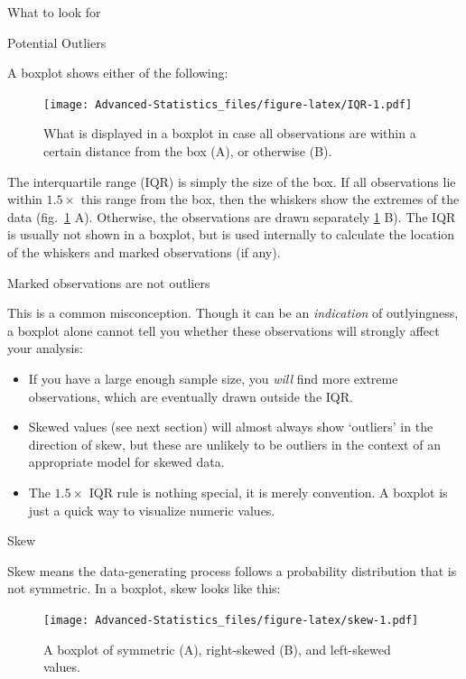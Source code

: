 \documentclass[
]{book}
\providecommand{\tightlist}{%
  \setlength{\itemsep}{0pt}\setlength{\parskip}{0pt}}
\begin{document}
What to look for

Potential Outliers

A boxplot shows either of the following:

\begin{figure}
\centering
\texttt{[image: Advanced-Statistics\_files/figure-latex/IQR-1.pdf]}
\caption{\label{fig:IQR}What is displayed in a boxplot in case all observations are within a certain distance from the box (A), or otherwise (B).}
\end{figure}

The interquartile range (IQR) is simply the size of the box. If all observations lie within \(1.5\times\) this range from the box, then the whiskers show the extremes of the data (fig.~\ref{fig:IQR} A). Otherwise, the observations are drawn separately \ref{fig:IQR} B). The IQR is usually not shown in a boxplot, but is used internally to calculate the location of the whiskers and marked observations (if any).

Marked observations are not outliers

This is a common misconception. Though it can be an \emph{indication} of outlyingness, a boxplot alone cannot tell you whether these observations will strongly affect your analysis:

\begin{itemize}
\tightlist
\item
  If you have a large enough sample size, you \emph{will} find more extreme observations, which are eventually drawn outside the IQR.
\item
  Skewed values (see next section) will almost always show `outliers' in the direction of skew, but these are unlikely to be outliers in the context of an appropriate model for skewed data.
\item
  The \(1.5\times\) IQR rule is nothing special, it is merely convention. A boxplot is just a quick way to visualize numeric values.
\end{itemize}

Skew

Skew means the data-generating process follows a probability distribution that is not symmetric. In a boxplot, skew looks like this:

\begin{figure}
\centering
\texttt{[image: Advanced-Statistics\_files/figure-latex/skew-1.pdf]}
\caption{\label{fig:skew}A boxplot of symmetric (A), right-skewed (B), and left-skewed values.}
\end{figure}
\end{document}
